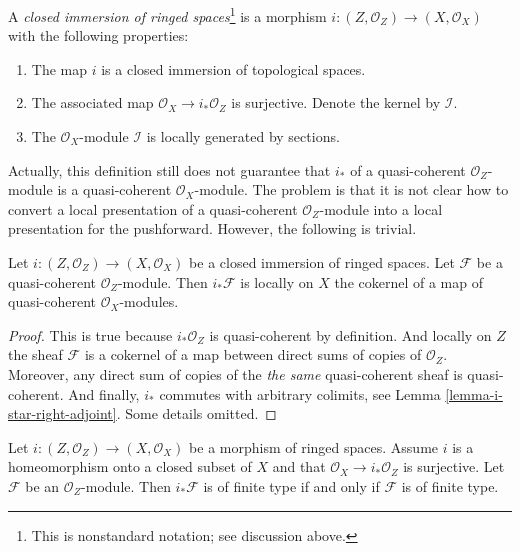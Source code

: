 \begin{definition}
\label{definition-closed-immersion}
A {\it closed immersion of ringed spaces}\footnote{This is
nonstandard notation; see discussion above.} is a morphism
$i : (Z, \mathcal{O}_Z) \to (X, \mathcal{O}_X)$
with the following properties:
\begin{enumerate}
\item The map $i$ is a closed immersion of topological spaces.
\item The associated map $\mathcal{O}_X \to i_*\mathcal{O}_Z$
is surjective. Denote the kernel by $\mathcal{I}$.
\item The $\mathcal{O}_X$-module $\mathcal{I}$ is locally
generated by sections.
\end{enumerate}
\end{definition}

\noindent
Actually, this definition still does not guarantee that
$i_*$ of a quasi-coherent $\mathcal{O}_Z$-module is a
quasi-coherent $\mathcal{O}_X$-module. The problem is that
it is not clear how to convert a local presentation of
a quasi-coherent $\mathcal{O}_Z$-module into a local
presentation for the pushforward. However, the following
is trivial.

\begin{lemma}
\label{lemma-i-star-quasi-coherent}
Let $i : (Z, \mathcal{O}_Z) \to (X, \mathcal{O}_X)$
be a closed immersion of ringed spaces.
Let $\mathcal{F}$ be a quasi-coherent $\mathcal{O}_Z$-module.
Then $i_*\mathcal{F}$ is locally on $X$ the cokernel of
a map of quasi-coherent $\mathcal{O}_X$-modules.
\end{lemma}

\begin{proof}
This is true because $i_*\mathcal{O}_Z$ is quasi-coherent
by definition. And locally on $Z$ the sheaf $\mathcal{F}$
is a cokernel of a map between direct sums of copies
of $\mathcal{O}_Z$. Moreover, any direct sum of copies of the
{\it the same} quasi-coherent sheaf is quasi-coherent.
And finally, $i_*$ commutes with arbitrary colimits,
see Lemma \ref{lemma-i-star-right-adjoint}. Some details omitted.
\end{proof}

\begin{lemma}
\label{lemma-i-star-reflects-finite-type}
Let $i : (Z, \mathcal{O}_Z) \to (X, \mathcal{O}_X)$ be a morphism of ringed
spaces. Assume $i$ is a homeomorphism onto a closed subset of $X$ and
that $\mathcal{O}_X \to i_*\mathcal{O}_Z$ is surjective.
Let $\mathcal{F}$ be an $\mathcal{O}_Z$-module.
Then $i_*\mathcal{F}$ is of finite type if and only if
$\mathcal{F}$ is of finite type.
\end{lemma}


